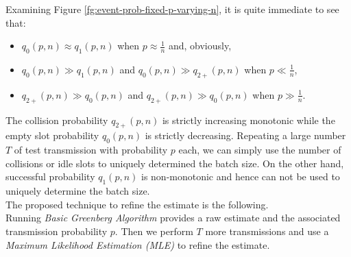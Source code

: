 \documentclass[11pt,a4paper,twoside,openright]{book}
\begin{document}
Examining Figure \ref{fg:event-prob-fixed-p-varying-n}, it is quite immediate to see that:
\begin{itemize}
\item $q_{0}(p,n) \approx q_{1}(p,n)$ when $p\approx {\displaystyle\frac{1}{n}}$ and, obviously,
\item $q_{0}(p,n) \gg q_{1}(p,n)$ and $q_{0}(p,n) \gg q_{2+}(p,n)$ when $p \ll {\displaystyle\frac{1}{n}}$,
\item $q_{2+}(p,n) \gg q_{0}(p,n)$ and $q_{2+}(p,n) \gg q_{0}(p,n)$ when $p \gg {\displaystyle\frac{1}{n}}$.
\end{itemize}
The collision probability $q_{2+}(p,n)$ is strictly increasing monotonic while the empty slot probability $q_{0}(p,n)$ is strictly decreasing. Repeating a large number $T$ of test transmission with  probability $p$ each, we can simply use the number of collisions or idle slots to uniquely determined the batch size. On the other hand, successful probability $q_{1}(p,n)$ is non-monotonic and hence can not be used to uniquely determine the batch size.\\
 
\noindent The proposed technique to refine the estimate is the following.\\
Running \emph{Basic Greenberg Algorithm} provides a raw estimate and the associated transmission probability $p$. Then we perform $T$ more transmissions and use a \emph{Maximum Likelihood Estimation (MLE)} to refine the estimate.\\ 
 
\end{document}
